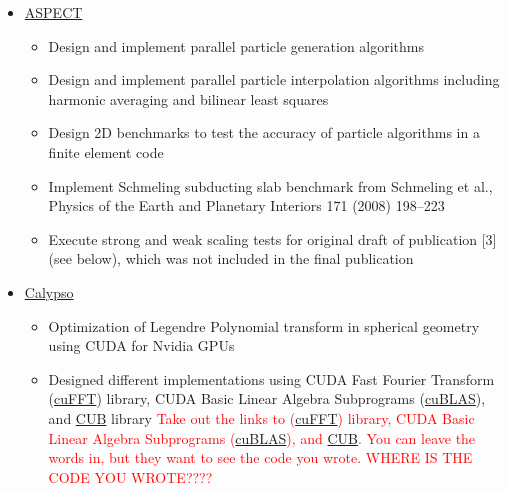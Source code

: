 \documentclass[11pt]{ltxdoc}
\begin{document}
\begin{description}
\begin{description}
      \vskip 06pt
      

      \begin{itemize}
      	
        \item \href{https://geodynamics.org/cig/software/aspect/}{ASPECT}
              
          \begin{itemize}        
            
            \item Design and implement parallel particle generation algorithms
           
            \item Design and implement parallel particle interpolation algorithms including harmonic averaging and bilinear least squares
           
            \item Design 2D benchmarks to test the accuracy of particle algorithms in a finite element code
           
            \item Implement Schmeling subducting slab benchmark from Schmeling et al., Physics of the Earth and Planetary Interiors 171 (2008) 198--223
            
            \item Execute strong and weak scaling tests for original draft of publication [3] (see below), which was not included in the final publication              

           \end{itemize}

        \item       \href{https://geodynamics.org/cig/software/calypso/}{Calypso}         

          \begin{itemize}
          	
          	\item Optimization of Legendre Polynomial transform in spherical geometry using CUDA for Nvidia GPUs 
          	
          	\item Designed different implementations using CUDA Fast Fourier Transform 
          	  (\href{https://docs.nvidia.com/cuda/cufft/index.html}{cuFFT}) library, CUDA Basic Linear Algebra Subprograms (\href{https://docs.nvidia.com/cuda/cublas/index.html}{cuBLAS}), and \href{https://nvlabs.github.io/cub/}{CUB} library
          	  \textcolor{red}{Take out the links to (\href{https://docs.nvidia.com/cuda/cufft/index.html}{cuFFT}) library, CUDA Basic Linear Algebra Subprograms (\href{https://docs.nvidia.com/cuda/cublas/index.html}{cuBLAS}), and \href{https://nvlabs.github.io/cub/}{CUB}.
              You can leave the words in, but they want to see the code you wrote.
          	  WHERE IS THE CODE YOU WROTE????}
          	

\end{itemize}
\end{itemize}
\end{description}
\end{description}
\end{document}
